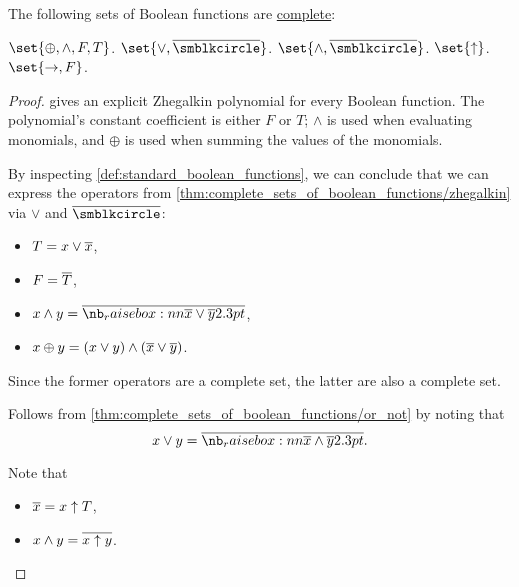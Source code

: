 \begin{proposition}\label{thm:complete_sets_of_boolean_functions}
  The following sets of Boolean functions are \hyperref[def:boolean_closure/complete]{complete}:
  \begin{thmenum}
     \( \set{ \oplus, \wedge, F, T } \).
     \( \set{ \vee, \oline{\anon} } \).
     \( \set{ \wedge, \oline{\anon} } \).
     \( \set{ \uparrow } \).
     \( \set{ \rightarrow, F } \).
  \end{thmenum}
\end{proposition}
\begin{proof}
    gives an explicit Zhegalkin polynomial for every Boolean function. The polynomial's constant coefficient is either \( F \) or \( T \); \( \wedge \) is used when evaluating monomials, and \( \oplus \) is used when summing the values of the monomials.

   By inspecting \cref{def:standard_boolean_functions}, we can conclude that we can express the operators from \cref{thm:complete_sets_of_boolean_functions/zhegalkin} via \( \vee \) and \( \oline{\anon} \):
  \begin{itemize}
    \item \( T = x \vee \oline{x} \),
    \item \( F = \oline{T} \),
    \item \( x \wedge y = \oline*{\oline{x} \vee \oline{y}} \),
    \item \( x \oplus y = (x \vee y) \wedge (\oline{x} \vee \oline{y}) \).
  \end{itemize}

  Since the former operators are a complete set, the latter are also a complete set.

   Follows from \cref{thm:complete_sets_of_boolean_functions/or_not} by noting that
  \begin{equation*}
    x \vee y = \oline*{\oline x \wedge \oline y}.
  \end{equation*}

   Note that
  \begin{itemize}
    \item \( \oline{x} = x \uparrow T \),
    \item \( x \wedge y = \oline{x \uparrow y} \).
  \end{itemize}


\end{proof}
